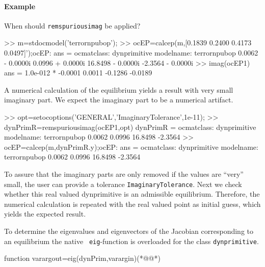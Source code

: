 \paragraph{Example} When should \lstinline+remspuriousimag+ be applied? 
\begin{matlab}
>> m=stdocmodel('terrornpubop');
>> ocEP=calcep(m,[0.1839 0.2400 0.4173 0.0497]');ocEP{:}
ans =
ocmatclass: dynprimitive
modelname: terrornpubop
   0.0062 - 0.0000i
   0.0996 + 0.0000i
  16.8498 - 0.0000i
  -2.3564 - 0.0000i
>> imag(ocEP{1})
ans =
  1.0e-012 *
   -0.0001
    0.0011
   -0.1286
   -0.0189
\end{matlab}
A numerical calculation of the equilibrium yields a result with very small imaginary part. We expect the imaginary part to be a numerical artifact.
\begin{matlab}
>> opt=setocoptions('GENERAL','ImaginaryTolerance',1e-11);
>> dynPrimR=remspuriousimag(ocEP{1},opt)
dynPrimR =
ocmatclass: dynprimitive
modelname: terrornpubop
    0.0062
    0.0996
   16.8498
   -2.3564
>> ocEP=calcep(m,dynPrimR.y);ocEP{:}
ans =
ocmatclass: dynprimitive
modelname: terrornpubop
    0.0062
    0.0996
   16.8498
   -2.3564
\end{matlab}
To assure that the imaginary parts are only removed if the values are ``very'' small, the user can provide a tolerance \lstinline+ImaginaryTolerance+. Next we check whether this real valued dynprimitive is an admissible equilibrium. Therefore, the numerical calculation is repeated with the real valued point as initial guess, which yields the expected result.

To determine the eigenvalues and eigenvectors of the Jacobian corresponding to an equilibrium the native \MATL\ \lstinline+eig+-function is overloaded for the class \lstinline+dynprimitive+.
\begin{matlab}
function varargout=eig(dynPrim,varargin)(*@@*)
%
%
%
\end{matlab}
